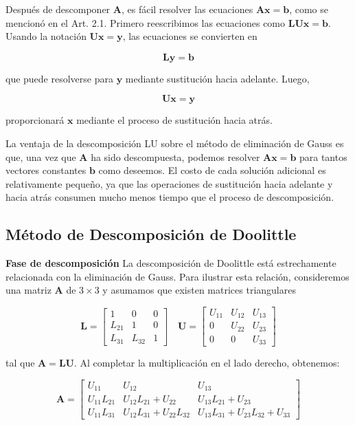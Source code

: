 \documentclass[12pt,letterpaper]{article}
\theoremstyle{definition}
\theoremstyle{plain}
\theoremstyle{remark}
\begin{document}
Después de descomponer $\mathbf{A}$, es fácil resolver las ecuaciones $\mathbf{Ax} = \mathbf{b}$, como se mencionó en el Art. 2.1. Primero reescribimos las ecuaciones como $\mathbf{LUx} = \mathbf{b}$. Usando la notación $\mathbf{Ux} = \mathbf{y}$, las ecuaciones se convierten en

\[
\mathbf{Ly} = \mathbf{b}
\]

que puede resolverse para $\mathbf{y}$ mediante sustitución hacia adelante. Luego,

\[
\mathbf{Ux} = \mathbf{y}
\]

proporcionará $\mathbf{x}$ mediante el proceso de sustitución hacia atrás.

La ventaja de la descomposición LU sobre el método de eliminación de Gauss es que, una vez que $\mathbf{A}$ ha sido descompuesta, podemos resolver $\mathbf{Ax} = \mathbf{b}$ para tantos vectores constantes $\mathbf{b}$ como deseemos. El costo de cada solución adicional es relativamente pequeño, ya que las operaciones de sustitución hacia adelante y hacia atrás consumen mucho menos tiempo que el proceso de descomposición.

\subsection{Método de Descomposición de Doolittle}

\textbf{Fase de descomposición} La descomposición de Doolittle está estrechamente relacionada con la eliminación de Gauss. Para ilustrar esta relación, consideremos una matriz $\mathbf{A}$ de $3 \times 3$ y asumamos que existen matrices triangulares

\[
\mathbf{L} = 
\begin{bmatrix}
1 & 0 & 0 \\
L_{21} & 1 & 0 \\
L_{31} & L_{32} & 1
\end{bmatrix}
\quad
\mathbf{U} = 
\begin{bmatrix}
U_{11} & U_{12} & U_{13} \\
0 & U_{22} & U_{23} \\
0 & 0 & U_{33}
\end{bmatrix}
\]

tal que $\mathbf{A} = \mathbf{LU}$. Al completar la multiplicación en el lado derecho, obtenemos:

\[
\mathbf{A} = 
\begin{bmatrix}
U_{11} & U_{12} & U_{13} \\
U_{11}L_{21} & U_{12}L_{21} + U_{22} & U_{13}L_{21} + U_{23} \\
U_{11}L_{31} & U_{12}L_{31} + U_{22}L_{32} & U_{13}L_{31} + U_{23}L_{32} + U_{33}
\end{bmatrix} \label{eq:1.7}
\tag{1.7}
\]
\end{document}
